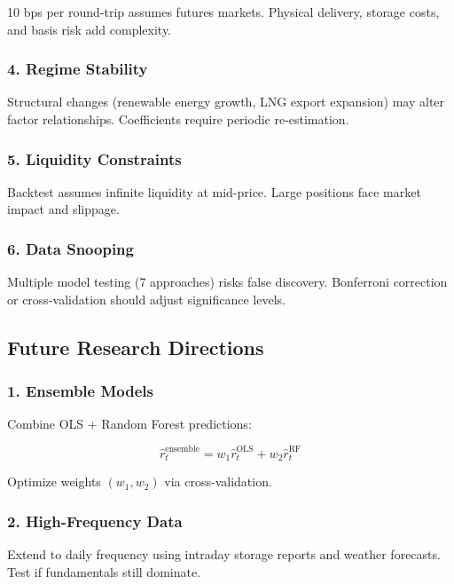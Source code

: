 \documentclass[12pt,a4paper]{article}
\begin{document}
10 bps per round-trip assumes futures markets. Physical delivery, storage costs, and basis risk add complexity.

\subsubsection{4. Regime Stability}

Structural changes (renewable energy growth, LNG export expansion) may alter factor relationships. Coefficients require periodic re-estimation.

\subsubsection{5. Liquidity Constraints}

Backtest assumes infinite liquidity at mid-price. Large positions face market impact and slippage.

\subsubsection{6. Data Snooping}

Multiple model testing (7 approaches) risks false discovery. Bonferroni correction or cross-validation should adjust significance levels.

\subsection{Future Research Directions}

\subsubsection{1. Ensemble Models}

Combine OLS + Random Forest predictions:

\begin{equation}
\hat{r}_t^{\text{ensemble}} = w_1 \hat{r}_t^{\text{OLS}} + w_2 \hat{r}_t^{\text{RF}}
\end{equation}

Optimize weights $(w_1, w_2)$ via cross-validation.

\subsubsection{2. High-Frequency Data}

Extend to daily frequency using intraday storage reports and weather forecasts. Test if fundamentals still dominate.
\end{document}
